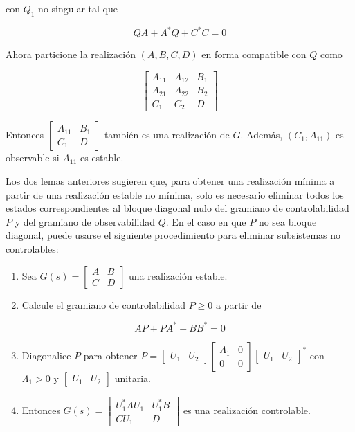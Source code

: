 con $Q_{1}$ no singular tal que

$$
Q A+A^{*} Q+C^{*} C=0
$$

Ahora particione la realización $(A, B, C, D)$ en forma compatible con $Q$ como

$$
\left[\begin{array}{cc|c}
A_{11} & A_{12} & B_{1} \\
A_{21} & A_{22} & B_{2} \\
\hline C_{1} & C_{2} & D
\end{array}\right]
$$

Entonces $\left[\begin{array}{c|c}A_{11} & B_{1} \\ \hline C_{1} & D\end{array}\right]$ también es una realización de $G$. Además, $\left(C_{1}, A_{11}\right)$ es observable si $A_{11}$ es estable.

Los dos lemas anteriores sugieren que, para obtener una realización mínima a partir de una realización estable no mínima, solo es necesario eliminar todos los estados correspondientes al bloque diagonal nulo del gramiano de controlabilidad $P$ y del gramiano de observabilidad $Q$. En el caso en que $P$ no sea bloque diagonal, puede usarse el siguiente procedimiento para eliminar subsistemas no controlables:

\begin{enumerate}
  \item Sea $G(s)=\left[\begin{array}{c|c}A & B \\ \hline C & D\end{array}\right]$ una realización estable.
  \item Calcule el gramiano de controlabilidad $P \geq 0$ a partir de
\end{enumerate}

$$
A P+P A^{*}+B B^{*}=0
$$

\begin{enumerate}
  \setcounter{enumi}{2}
  \item Diagonalice $P$ para obtener $P=\left[\begin{array}{ll}U_{1} & U_{2}\end{array}\right]\left[\begin{array}{cc}\Lambda_{1} & 0 \\ 0 & 0\end{array}\right]\left[\begin{array}{ll}U_{1} & U_{2}\end{array}\right]^{*}$ con $\Lambda_{1}>0$ y $\left[\begin{array}{ll}U_{1} & U_{2}\end{array}\right]$ unitaria.
  \item Entonces $G(s)=\left[\begin{array}{c|c}U_{1}^{*} A U_{1} & U_{1}^{*} B \\ \hline C U_{1} & D\end{array}\right]$ es una realización controlable.
\end{enumerate}

